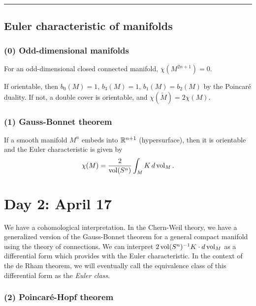 \documentclass{../../small}
\begin{document}
\smallskip\hrule

\subsection*{Euler characteristic of manifolds}

\subsubsection*{(0) Odd-dimensional manifolds}

\begin{thm*}
For an odd-dimensional closed connected manifold, $\chi(M^{2n+1})=0$.
\end{thm*}
\begin{pf}
If orientable, then $b_0(M)=1$, $b_3(M)=1$, $b_1(M)=b_2(M)$ by the Poincar\'e duality.
If not, a double cover is orientable, and $\chi(\tilde M)=2\chi(M)$.
\end{pf}


\subsubsection*{(1) Gauss-Bonnet theorem}
\begin{thm*}
If a smooth manifold $M^n$ embeds into $\mathbb{R}^{n+1}$ (hypersurface), then it is orientable and the Euler characteristic is given by
\[\chi(M)=\frac2{\operatorname{vol}(S^n)}\int_MK\,d\operatorname{vol}_M.\]
\end{thm*}





\section{Day 2: April 17}

We have a cohomological interpretation.
In the Chern-Weil theory, we have a generalized version of the Gauss-Bonnet theorem for a general compact manifold using the theory of connections.
We can interpret $2\operatorname{vol}(S^n)^{-1}K\cdot d\operatorname{vol}_M$ as a differential form which provides with the Euler characteristic.
In the context of the de Rham theorem, we will eventually call the equivalence class of this differential form as the \emph{Euler class}.

\subsubsection*{(2) Poincar\'e-Hopf theorem}
\end{document}
